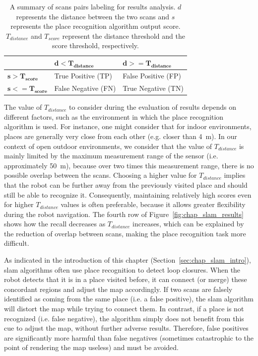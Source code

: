 \begin{table}
    \centering
    \begin{tabular}{@{}l|ll@{}}
        \toprule
                                  & $\mathbf{d < T_{distance}}$ & $\mathbf{d >= T_{distance}}$ \\
        \hline
        $\mathbf{s > T_{score}}$  & True Positive (TP)          & False Positive (FP) \\
        $\mathbf{s <= T_{score}}$ & False Negative (FN)         & True Negative (TN) \\
        \bottomrule
    \end{tabular}
    \caption[Summary of scans pairs labeling for results analysis.]{A summary of scans pairs labeling for results analysis. $d$ represents the distance between the two scans and $s$ represents the place recognition algorithm output score. $T_{distance}$ and $T_{score}$ represent the distance threshold and the score threshold, respectively.}
    \label{tab:chap_slam_results_labeling}
\end{table}

The value of $T_{distance}$ to consider during the evaluation of results depends on different factors, such as the environment in which the place recognition algorithm is used. For instance, one might consider that for indoor environments, places are generally very close from each other (e.g. closer than \SI{4}{\meter}). In our context of open outdoor environments, we consider that the value of $T_{distance}$ is mainly limited by the maximum measurement range of the sensor (i.e. approximately \SI{50}{\meter}), because over two times this measurement range, there is no possible overlap between the scans. Choosing a higher value for $T_{distance}$ implies that the robot can be further away from the previously visited place and should still be able to recognize it. Consequently, maintaining relatively high scores even for higher $T_{distance}$ values is often preferable, because it allows greater flexibility during the robot navigation. The fourth row of Figure~\ref{fig:chap_slam_results} shows how the recall decreases as $T_{distance}$ increases, which can be explained by the reduction of overlap between scans, making the place recognition task more difficult.

As indicated in the introduction of this chapter (Section~\ref{sec:chap_slam_intro}), \gls*{slam} algorithms often use place recognition to detect loop closures. When the robot detects that it is in a place visited before, it can connect (or merge) these concordant regions and adjust the map accordingly. If two scans are falsely identified as coming from the same place (i.e. a false positive), the \gls*{slam} algorithm will distort the map while trying to connect them. In contrast, if a place is not recognized (i.e. false negative), the algorithm simply does not benefit from this cue to adjust the map, without further adverse results. Therefore, false positives are significantly more harmful than false negatives (sometimes catastrophic to the point of rendering the map useless) and must be avoided. 

